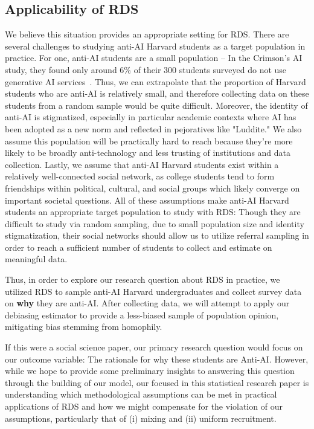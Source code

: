 \documentclass[11pt,a4paper,twocolumn,twoside]{rho-class/rho}
\begin{document}
\subsection{Applicability of RDS}
We believe this situation provides an appropriate setting for RDS. There are several challenges to studying anti-AI Harvard students as a target population in practice. For one, anti-AI students are a small population -- In the Crimson's AI study, they found only around 6\% of their 300 students surveyed do not use generative AI services~\cite{crimson2026aisurvey}. Thus, we can extrapolate that the proportion of Harvard students who are anti-AI is relatively small, and therefore collecting data on these students from a random sample would be quite difficult. Moreover, the identity of anti-AI is stigmatized, especially in particular academic contexts where AI has been adopted as a new norm and reflected in pejoratives like "Luddite." We also assume this population will be practically hard to reach because they're more likely to be broadly anti-technology and less trusting of institutions and data collection. Lastly, we assume that anti-AI Harvard students exist within a relatively well-connected social network, as college students tend to form friendships within political, cultural, and social groups which likely converge on important societal questions. All of these assumptions make anti-AI Harvard students an appropriate target population to study with RDS: Though they are difficult to study via random sampling, due to small population size and identity stigmatization, their social networks should allow us to utilize referral sampling in order to reach a sufficient number of students to collect and estimate on meaningful data.

Thus, in order to explore our research question about RDS in practice, we utilized RDS to sample anti-AI Harvard undergraduates and collect survey data on \textbf{why} they are anti-AI. After collecting data, we will attempt to apply our debiasing estimator to provide a less-biased sample of population opinion, mitigating bias stemming from homophily.

If this were a social science paper, our primary research question would focus on our outcome variable: The rationale for why these students are Anti-AI. However, while we hope to provide some preliminary insights to answering this question through the building of our model, our focused in this statistical research paper is understanding which methodological assumptions can be met in practical applications of RDS and how we might compensate for the violation of our assumptions, particularly that of (i) mixing and (ii) uniform recruitment.
\end{document}
